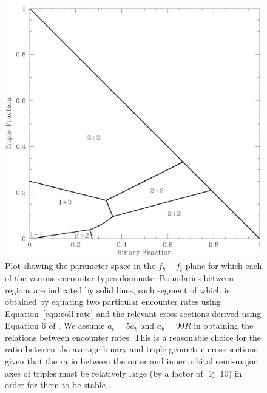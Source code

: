 \begin{enumerate}
\begin{figure} [!h]
  \begin{center}
 \includegraphics[scale=0.5]{Chapter-2/fig1.eps}
   \caption[Plot showing the parameter space in the f$_b$-$f_t$ plane for
which each of the various encounter types dominate]{Plot showing
  the parameter space in the $f_b-f_t$ plane for
which each of the various encounter types dominate.  Boundaries
between regions are indicated by solid lines, each segment of which is
obtained by equating two particular encounter rates using
Equation~\ref{eqn:coll-rate} and the relevant cross sections derived
using Equation 6 of \citet{leonard89}.  We assume $a_t =
5a_b$ and $a_b = 90 R$ in obtaining the relations between encounter
rates.  This is a reasonable choice for the ratio between
the average binary and triple geometric cross sections given that
the ratio between the outer and inner orbital semi-major axes of
triples must be relatively large (by a factor of $\gtrsim$ 10) in
order for them to be stable \citep{mardling01}.
   \label{fig:fb-ft}}
  \end{center}
\end{figure}


\end{enumerate}

